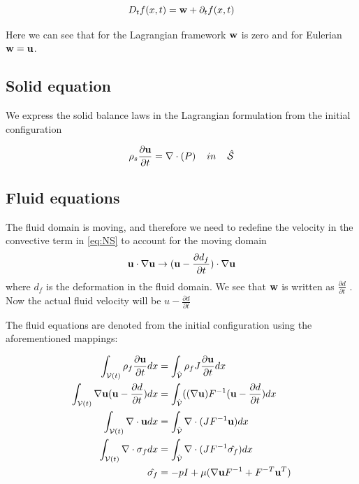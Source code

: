 \begin{equation}
D_t f(x,t) = \bold{w} + \partial_t f(x,t)
\end{equation}

Here we can see that for the Lagrangian framework $ \bold{w}$ is zero and for Eulerian $\bold{w} = \bold{u}$.

\subsection{Solid equation}
We express the solid balance laws in the Lagrangian formulation from the initial configuration

\begin{equation}
\rho_s \frac{\partial \bold{u}}{\partial t} = \nabla \cdot (P) \hspace{4mm}in\hspace{4mm} \hat{\mathcal{S}} 
\end{equation}

\subsection{Fluid equations}


The fluid domain is moving, and therefore we need to redefine the velocity in the convective term in \eqref{eq:NS} to account for the moving domain 
\begin{equation}
\bold{u} \cdot \nabla \bold{u} \rightarrow (\bold{u}-\frac{\partial d_f}{\partial t}) \cdot \nabla \bold{u}  
\end{equation}
where $d_f$ is the deformation in the fluid domain. We see that $\bold{w}$ is written as $\frac{\partial d}{\partial t}$ . Now the actual fluid velocity will be $u-\frac{\partial d}{\partial t}$ 

The fluid equations are denoted from the initial configuration using the aforementioned mappings:

\begin{align}
\int_{\mathcal{V}(t)} \rho_f \frac{\partial \bold{u}}{\partial t} dx & = \int_{\hat{\mathcal{V}}}  \rho_f J \frac{\partial \bold{u}}{\partial t} dx \\
\int_{\mathcal{V}(t)} \nabla \bold{u} (\bold{u}-\frac{\partial d}{\partial t}) dx  &= \int_{\hat{\mathcal{V}}} ((\nabla \bold{u})F^{-1}(\bold{u}-\frac{\partial d}{\partial t}) dx  \\
\int_{\mathcal{V}(t)} \nabla \cdot \bold{u} dx  &=\int_{\hat{\mathcal{V}}}  \nabla \cdot (J F^{-1} \bold{u}  ) dx \\
\int_{\mathcal{V}(t)} \nabla \cdot \sigma_f dx &= \int_{\hat{\mathcal{V}}} \nabla \cdot( J F^{-1} \hat{\sigma_f} )     dx \\
\hat{\sigma_f} &= -pI + \mu ( \nabla \bold{u} F^{-1} + F^{-T} \bold{u}^{T}  ) 
\end{align}

